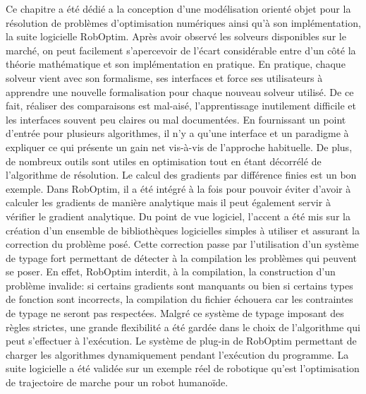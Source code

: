 Ce chapitre a été dédié a la conception d'une modélisation orienté
objet pour la résolution de problèmes d'optimisation numériques ainsi
qu'à son implémentation, la suite logicielle RobOptim. Après avoir
observé les solveurs disponibles sur le marché, on peut facilement
s'apercevoir de l'écart considérable entre d'un côté la théorie
mathématique et son implémentation en pratique. En pratique, chaque
solveur vient avec son formalisme, ses interfaces et force ses
utilisateurs à apprendre une nouvelle formalisation pour chaque
nouveau solveur utilisé. De ce fait, réaliser des comparaisons est
mal-aisé, l'apprentissage inutilement difficile et les interfaces
souvent peu claires ou mal documentées. En fournissant un point
d'entrée pour plusieurs algorithmes, il n'y a qu'une interface et un
paradigme à expliquer ce qui présente un gain net vis-à-vis de
l'approche habituelle. De plus, de nombreux outils sont utiles en
optimisation tout en étant décorrélé de l'algorithme de résolution. Le
calcul des gradients par différence finies est un bon exemple. Dans
RobOptim, il a été intégré à la fois pour pouvoir éviter d'avoir à
calculer les gradients de manière analytique mais il peut également
servir à vérifier le gradient analytique. Du point de vue logiciel,
l'accent a été mis sur la création d'un ensemble de bibliothèques
logicielles simples à utiliser et assurant la correction du problème
posé. Cette correction passe par l'utilisation d'un système de typage
fort permettant de détecter à la compilation les problèmes qui peuvent
se poser. En effet, RobOptim interdit, à la compilation, la
construction d'un problème invalide: si certains gradients sont
manquants ou bien si certains types de fonction sont incorrects, la
compilation du fichier échouera car les contraintes de typage ne
seront pas respectées. Malgré ce système de typage imposant des règles
strictes, une grande flexibilité a été gardée dans le choix de
l'algorithme qui peut s'effectuer à l'exécution. Le système de plug-in
de RobOptim permettant de charger les algorithmes dynamiquement
pendant l'exécution du programme. La suite logicielle a été validée
sur un exemple réel de robotique qu'est l'optimisation de trajectoire
de marche pour un robot humanoïde.
